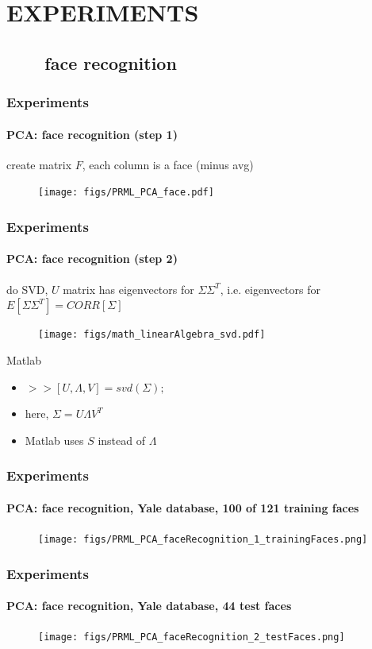 \section{EXPERIMENTS}
\subsection{\ \ \ \ face recognition}
\begin{frame}
\frametitle{Experiments}
\framesubtitle{PCA: face recognition (step 1)}
\logoCSIPCPL\mypagenum
	create matrix $F$, each column is a face (minus avg)	
	\begin{figure}
		\texttt{[image: figs/PRML\_PCA\_face.pdf]}
	\end{figure}
\end{frame}


\begin{frame}
\frametitle{Experiments}
\framesubtitle{PCA: face recognition (step 2)}
\logoCSIPCPL\mypagenum
	do SVD, $U$ matrix has eigenvectors for $\Sigma\Sigma^T$, i.e. eigenvectors for $E[\Sigma\Sigma^T]=CORR[\Sigma]$
	\begin{figure}
		\texttt{[image: figs/math\_linearAlgebra\_svd.pdf]}
	\end{figure}
	Matlab
	\begin{itemize}
		\item $>>[U, \Lambda, V] = svd(\Sigma);$  
		\item here, $\Sigma=U\Lambda V^T$\\
		\item Matlab uses $S$ instead of $\Lambda$
	\end{itemize}
\end{frame}



\begin{frame}
\frametitle{Experiments}
\framesubtitle{PCA: face recognition, Yale database, 100 of 121 training faces}
\logoCSIPCPL\mypagenum	
	\begin{figure}
		\texttt{[image: figs/PRML\_PCA\_faceRecognition\_1\_trainingFaces.png]}
	\end{figure}
\end{frame}


\begin{frame}
\frametitle{Experiments}
\framesubtitle{PCA: face recognition, Yale database, 44 test faces}
\logoCSIPCPL\mypagenum	
	\begin{figure}
		\texttt{[image: figs/PRML\_PCA\_faceRecognition\_2\_testFaces.png]}
	\end{figure}
\end{frame}



